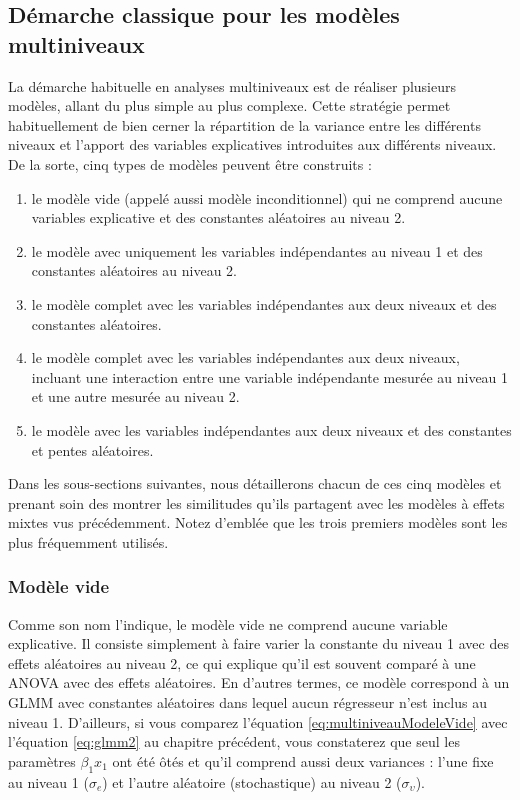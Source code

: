 \documentclass[
  11pt,
  french,
]{book}
\providecommand{\tightlist}{%
  \setlength{\itemsep}{0pt}\setlength{\parskip}{0pt}}
\begin{document}
\hypertarget{sect0822}{%
\subsection{Démarche classique pour les modèles multiniveaux}\label{sect0822}}

La démarche habituelle en analyses multiniveaux est de réaliser plusieurs modèles, allant du plus simple au plus complexe. Cette stratégie permet habituellement de bien cerner la répartition de la variance entre les différents niveaux et l'apport des variables explicatives introduites aux différents niveaux. De la sorte, cinq types de modèles peuvent être construits :

\begin{enumerate}
\def\labelenumi{\arabic{enumi}.}
\tightlist
\item
  le modèle vide (appelé aussi modèle inconditionnel) qui ne comprend aucune variables explicative et des constantes aléatoires au niveau 2.
\item
  le modèle avec uniquement les variables indépendantes au niveau 1 et des constantes aléatoires au niveau 2.
\item
  le modèle complet avec les variables indépendantes aux deux niveaux et des constantes aléatoires.
\item
  le modèle complet avec les variables indépendantes aux deux niveaux, incluant une interaction entre une variable indépendante mesurée au niveau 1 et une autre mesurée au niveau 2.
\item
  le modèle avec les variables indépendantes aux deux niveaux et des constantes et pentes aléatoires.
\end{enumerate}

Dans les sous-sections suivantes, nous détaillerons chacun de ces cinq modèles et prenant soin des montrer les similitudes qu'ils partagent avec les modèles à effets mixtes vus précédemment. Notez d'emblée que les trois premiers modèles sont les plus fréquemment utilisés.

\hypertarget{sect08221}{%
\subsubsection{Modèle vide}\label{sect08221}}

Comme son nom l'indique, le modèle vide ne comprend aucune variable explicative. Il consiste simplement à faire varier la constante du niveau 1 avec des effets aléatoires au niveau 2, ce qui explique qu'il est souvent comparé à une ANOVA avec des effets aléatoires. En d'autres termes, ce modèle correspond à un GLMM avec constantes aléatoires dans lequel aucun régresseur n'est inclus au niveau 1. D'ailleurs, si vous comparez l'équation \eqref{eq:multiniveauModeleVide} avec l'équation \eqref{eq:glmm2} au chapitre précédent, vous constaterez que seul les paramètres \(\beta_1 x_1\) ont été ôtés et qu'il comprend aussi deux variances : l'une fixe au niveau 1 (\(\sigma_e\)) et l'autre aléatoire (stochastique) au niveau 2 (\(\sigma_{\upsilon}\)).
\end{document}

